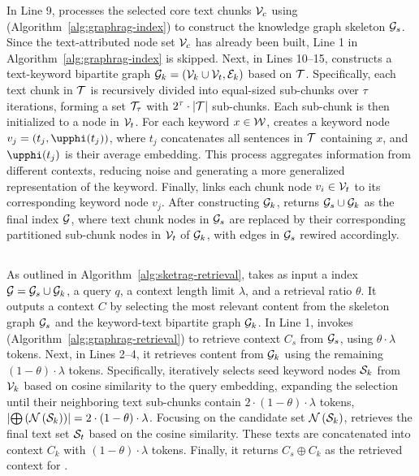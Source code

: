 In Line 9, \sketindex processes the selected core text chunks $\mathcal{V}_c$ using \graphindex (Algorithm~\ref{alg:graphrag-index}) to construct the knowledge graph skeleton $\mathcal{G}_s$. Since the text-attributed node set $\mathcal{V}_c$ has already been built, Line 1 in Algorithm~\ref{alg:graphrag-index} is skipped.
Next, in Lines 10--15, \sketindex constructs a text-keyword bipartite graph $\mathcal{G}_k = (\mathcal{V}_k \cup \mathcal{V}_t, \mathcal{E}_k)$ based on $\mathcal{T}$. Specifically, each text chunk in $\mathcal{T}$ is recursively divided into equal-sized sub-chunks over $\tau$ iterations, forming a set $\mathcal{T}_{\tau}$ with $2^{\tau}\cdot|\mathcal{T}|$ sub-chunks. Each sub-chunk is then initialized to a node in $\mathcal{V}_t$. 
For each keyword $x\in \mathcal{W}$, \sketindex creates a keyword node $v_{j}=(t_j,\temb{t_j})$, where $t_j$ concatenates all sentences in $\mathcal{T}$ containing $x$, and $\temb{t_j}$ is their average embedding. This process aggregates information from different contexts, reducing noise and generating a more generalized representation of the keyword. Finally, \sketindex links each chunk node $v_i \in \mathcal{V}_t$ to its corresponding keyword node $v_j$.
After constructing $\mathcal{G}_k$, \sketindex returns $\mathcal{G}_s \cup \mathcal{G}_k$ as the final index $\mathcal{G}$, where text chunk nodes in $\mathcal{G}_s$ are replaced by their corresponding partitioned sub-chunk nodes in $\mathcal{V}_t$ of $\mathcal{G}_k$, with edges in $\mathcal{G}_s$ rewired accordingly.  




\subsection{\sketretrieval}\label{sec:subgraph-retrieval}
As outlined in Algorithm~\ref{alg:sketrag-retrieval}, \sketretrieval takes as input a \textgraph{} index $\mathcal{G} = \mathcal{G}_s \cup \mathcal{G}_k$, a query $q$, a context length limit $\lambda$, and a retrieval ratio $\theta$. It outputs a context $C$ by selecting the most relevant content from the skeleton graph $\mathcal{G}_s$ and the keyword-text bipartite graph $\mathcal{G}_k$.
In Line 1, \sketretrieval invokes \graphretrieval (Algorithm~\ref{alg:graphrag-retrieval}) to retrieve context $C_s$ from $\mathcal{G}_s$, using $\theta \cdot \lambda$ tokens. Next, in Lines 2–4, it retrieves content from $\mathcal{G}_k$ using the remaining $(1-\theta) \cdot \lambda$ tokens.
Specifically, \sketretrieval iteratively selects seed keyword nodes $\mathcal{S}_k$ from $\mathcal{V}_k$ based on cosine similarity to the query embedding, expanding the selection until their neighboring text sub-chunks contain $2 \cdot (1-\theta) \cdot \lambda$ tokens, \ie $\left|\bigoplus\left(\mathcal{N}\left(\mathcal{S}_k\right)\right)\right| = 2\cdot(1-\theta)\cdot\lambda$.
Focusing on the candidate set $\mathcal{N}\left(\mathcal{S}_k\right)$, \sketretrieval retrieves the final text set $\mathcal{S}_t$ based on the cosine similarity. These texts are concatenated into context $C_k$ with $(1-\theta) \cdot \lambda$ tokens. Finally, it returns $C_s\oplus C_k$ as the retrieved context for \sketrag.


